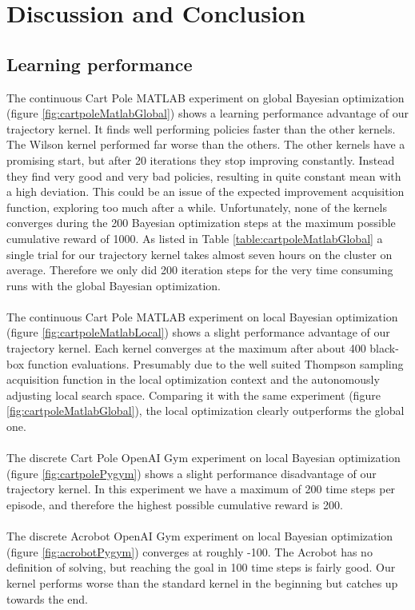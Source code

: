 \chapter{Discussion and Conclusion}
\label{chap:6}

\section{Learning performance}
The continuous Cart Pole MATLAB experiment on global Bayesian optimization (figure \ref{fig:cartpoleMatlabGlobal}) shows a learning performance advantage of our trajectory kernel. It finds well performing policies faster than the other kernels. The Wilson kernel performed far worse than the others. The other kernels have a promising start, but after 20 iterations they stop improving constantly. Instead they find very good and very bad policies, resulting in quite constant mean with a high deviation. This could be an issue of the expected improvement acquisition function, exploring too much after a while. Unfortunately, none of the kernels converges during the 200 Bayesian optimization steps at the maximum possible cumulative reward of 1000. As listed in Table \ref{table:cartpoleMatlabGlobal} a single trial for our trajectory kernel takes almost seven hours on the cluster on average. Therefore we only did 200 iteration steps for the very time consuming runs with the global Bayesian optimization.\\
\\
The continuous Cart Pole MATLAB experiment on local Bayesian optimization (figure \ref{fig:cartpoleMatlabLocal}) shows a slight performance advantage of our trajectory kernel. Each kernel converges at the maximum after about 400 black-box function evaluations. Presumably due to the well suited Thompson sampling acquisition function in the local optimization context and the autonomously adjusting local search space. Comparing it with the same experiment (figure \ref{fig:cartpoleMatlabGlobal}), the local optimization clearly outperforms the global one.\\
\\
The discrete Cart Pole OpenAI Gym experiment on local Bayesian optimization (figure \ref{fig:cartpolePygym}) shows a slight performance disadvantage of our trajectory kernel. In this experiment we have a maximum of 200 time steps per episode, and therefore the highest possible cumulative reward is 200.\\
\\
The discrete Acrobot OpenAI Gym experiment on local Bayesian optimization (figure \ref{fig:acrobotPygym}) converges at roughly -100. The Acrobot has no definition of solving, but reaching the goal in 100 time steps is fairly good. Our kernel performs worse than the standard kernel in the beginning but catches up towards the end.\\
